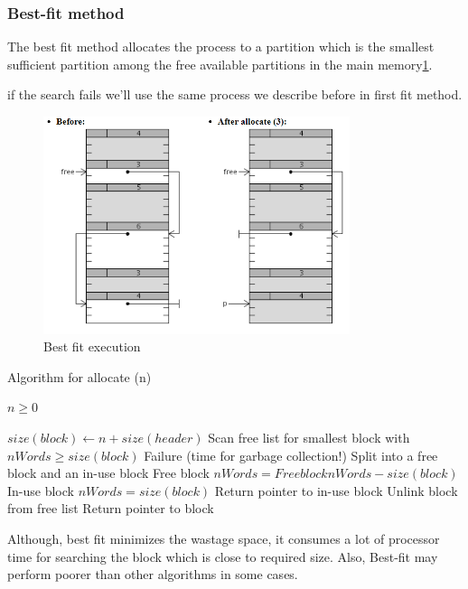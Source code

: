 \subsubsection{Best-fit method}
The best fit method allocates the process to a partition which is the smallest sufficient partition among the free available partitions in the main memory\ref{bf_alg}.

if the search fails we'll use the same process we describe before in first fit method.

\begin{figure}[htbp]
    \begin{center}
        \includegraphics[width=0.8\textwidth]{figures/BF_alg}
    \caption{Best fit execution }
    \label{bf_alg}
    \end{center}
\end{figure}
\begin{algorithm}
\caption{Algorithm for allocate (n)}
\begin{algorithmic} 
\REQUIRE $n \geq 0$

\STATE $size(block) \leftarrow n + size(header)$ 
\STATE Scan free list for smallest block with $ nWords \geq size(block)$ 
  \STATE  Failure (time for garbage collection!) 
   \STATE Split into a free block and an in-use block 
   \STATE Free block  $nWords = Free block nWords - size(block) $
   \STATE In-use block $nWords = size(block) $
   \STATE Return pointer to in-use block 
\ELSE 
   \STATE Unlink block from free list 
   \STATE Return pointer to block 
\ENDIF

\end{algorithmic}
\end{algorithm}


Although, best fit minimizes the wastage space, it consumes a lot of processor time for searching the block which is close to required size. Also, Best-fit may perform poorer than other algorithms in some cases.
 
